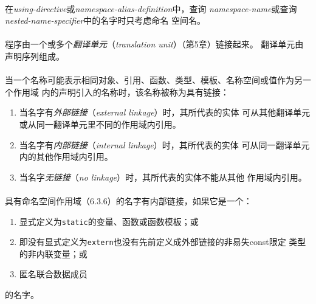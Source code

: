 \paragraph{}
在\textit{using-directive}或\textit{namespace-alias-definition}中，查询
\textit{namespace-name}或查询\textit{nested-name-specifier}中的名字时只考虑命名
空间名。

\paragraph{}
程序由一个或多个\textit{翻译单元}（\textit{translation unit}）（第5章）链接起来。
翻译单元由声明序列组成。


\paragraph{}
当一个名称可能表示相同对象、引用、函数、类型、模板、名称空间或值作为另一个作用域
内的声明引入的名称时，该名称被称为具有链接：
\begin{enumerate}
  \item{当名字有\textit{外部链接}（\textit{external linkage}）时，其所代表的实体
    可从其他翻译单元或从同一翻译单元里不同的作用域内引用。}
  \item{当名字有\textit{内部链接}（\textit{internal linkage}）时，其所代表的实体
    可从同一翻译单元内的其他作用域内引用。}
  \item{当名字\textit{无链接}（\textit{no linkage}）时，其所代表的实体不能从其他
    作用域内引用。}
\end{enumerate}

\paragraph{}
具有命名空间作用域（6.3.6）的名字有内部链接，如果它是一个：
\begin{enumerate}
  \item{显式定义为\texttt{static}的变量、函数或函数模板；或}
  \item{即没有显式定义为\texttt{extern}也没有先前定义成外部链接的非易失const限定
    类型的非内联变量；或}
  \item{匿名联合数据成员}
\end{enumerate}的名字。


